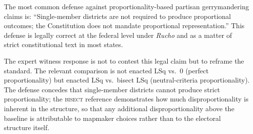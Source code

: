 The most common defense against proportionality-based partisan gerrymandering
claims is: ``Single-member districts are not required to produce proportional
outcomes; the Constitution does not mandate proportional representation.''
This defense is legally correct at the federal level under \textit{Rucho}
and as a matter of strict constitutional text in most states.

The expert witness response is not to contest this legal claim but to reframe
the standard. The relevant comparison is not enacted LSq vs.\ $0$ (perfect
proportionality) but enacted LSq vs.\ bisect LSq (neutral-criteria proportionality).
The defense concedes that single-member districts cannot produce strict proportionality;
the \textsc{bisect} reference demonstrates how much disproportionality is inherent
in the structure, so that any additional disproportionality above the baseline is
attributable to mapmaker choices rather than to the electoral structure itself.
